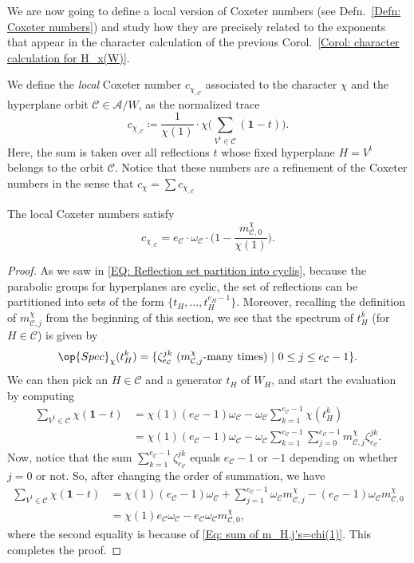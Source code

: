 We are now going to define a local version of Coxeter numbers (see Defn.~\ref{Defn: Coxeter numbers}) and study how they are precisely related to the exponents that appear in the character calculation of the previous Corol.~\ref{Corol: character calculation for H_x(W)}.


\begin{defi}\label{Defn: Local Coxeter numbers} 
We define the \emph{local} Coxeter number $c_{\chi_{,\mathcal{C}}}$ associated to the character $\chi$ and the hyperplane orbit $\mathcal{C}\in\mathcal{A}/W$, as the normalized trace $$c_{\chi_{,\mathcal{C}}}\coloneqq \dfrac{1}{\chi(1)}\cdot\chi\Big( \sum_{V^{t}\in\mathcal{C}}(\bm 1-t)\Big).$$ Here, the sum is taken over all reflections $t$ whose fixed hyperplane $H=V^{t}$ belongs to the orbit $\mathcal{C}$. Notice that these numbers are a refinement of the Coxeter numbers in the sense that $c_{\chi}=\sum c_{\chi_{,\mathcal{C}}}$
\end{defi}

\begin{prop}\label{Prop: local cox num formula}
The local Coxeter numbers satisfy $$c_{\chi_{,\mathcal{C}}}=e_{\mathcal{C}}\cdot\omega_{\mathcal{C}}\cdot\Big(1-\dfrac{m^{\chi}_{\mathcal{C},0}}{\chi(1)}\Big).$$
\end{prop}
\begin{proof}
As we saw in \eqref{EQ: Reflection set partition into cyclis}, because the parabolic groups for hyperplanes are cyclic, the set of reflections can be partitioned into sets of the form $\{t_H,\ldots,t^{e_H-1}_H\}$. Moreover, recalling the definition of $m^{\chi}_{\mathcal{C},j}$ from the beginning of this section, we see that the spectrum of $t_H^k$ (for $H\in\mathcal{C}$) is given by $$\op{Spec}_{\chi}(t_H^k)=\{ \zeta_{e_{\mathcal{C}}}^{jk}\ (m^{\chi}_{\mathcal{C},j}\text{-many times})\ |\ 0\leq j\leq e_{\mathcal{C}}-1\}.$$ We can then pick an $H\in\mathcal{C}$ and a generator $t_H$ of $W_H$, and start the evaluation by computing \begin{align*}
\sum_{V^t\in\mathcal{C}}\chi(\bm 1-t)&=\chi(1)(e_{\mathcal{C}}-1)\omega_{\mathcal{C}}-\omega_{\mathcal{C}}\sum_{k=1}^{e_{\mathcal{C}}-1}\chi(t_H^k)\\
&=\chi(1)(e_{\mathcal{C}}-1)\omega_{\mathcal{C}}-\omega_{\mathcal{C}}\sum_{k=1}^{e_{\mathcal{C}}-1}\sum_{j=0}^{e_{\mathcal{C}}-1}m^{\chi}_{\mathcal{C},j}\zeta_{e_{\mathcal{C}}}^{jk}.
\end{align*}
Now, notice that the sum $\sum_{k=1}^{e_{\mathcal{C}}-1}\zeta_{e_{\mathcal{C}}}^{jk}$ equals $e_{\mathcal{C}}-1$ or $-1$ depending on whether $j=0$ or not. So, after changing the order of summation, we have \begin{align*}
\sum_{V^t\in\mathcal{C}}\chi(\bm 1-t)&=\chi(1)(e_{\mathcal{C}}-1)\omega_{\mathcal{C}}+\sum_{j=1}^{e_{\mathcal{C}}-1}\omega_{\mathcal{C}}m^{\chi}_{\mathcal{C},j}-(e_{\mathcal{C}}-1)\omega_{\mathcal{C}}m^{\chi}_{\mathcal{C},0}\\
&=\chi(1)e_{\mathcal{C}}\omega_{\mathcal{C}}-e_{\mathcal{C}}\omega_{\mathcal{C}}m^{\chi}_{\mathcal{C},0},
\end{align*}where the second equality is because of \eqref{Eq: sum of m_H,j's=chi(1)}. This completes the proof.
\end{proof}

